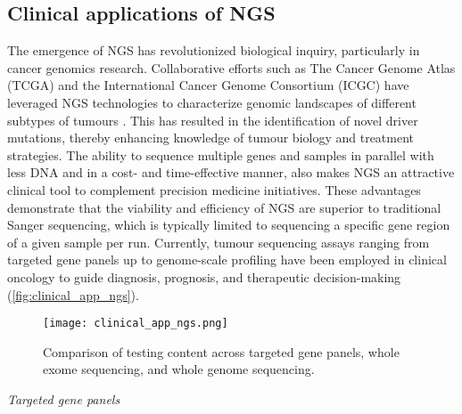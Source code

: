 
\subsection{Clinical applications of NGS}

The emergence of NGS has revolutionized biological inquiry, particularly in cancer genomics research. Collaborative efforts such as The Cancer Genome Atlas (\acs{TCGA}) and the International Cancer Genome Consortium (\acs{ICGC}) have leveraged NGS technologies to characterize genomic landscapes of different subtypes of tumours \cite{Robertson2017, Raphael2017, Ally2017, Nik-Zainal2016, Tirode2014}. This has resulted in the identification of novel driver mutations, thereby enhancing knowledge of tumour biology and treatment strategies. The ability to sequence multiple genes and samples in parallel with less DNA and in a cost- and time-effective manner, also makes NGS an attractive clinical tool to complement precision medicine initiatives. These advantages demonstrate that the viability and efficiency of NGS are superior to traditional Sanger sequencing, which is typically limited to sequencing a specific gene region of a given sample per run. Currently, tumour sequencing assays ranging from targeted gene panels up to genome-scale profiling have been employed in clinical oncology to guide diagnosis, prognosis, and therapeutic decision-making (\autoref{fig:clinical_app_ngs}).


\begin{figure}[H]
	\centering
	\texttt{[image: clinical\_app\_ngs.png]}
	\caption{Comparison of testing content across targeted gene panels, whole exome sequencing, and whole genome sequencing.}
	\label{fig:clinical_app_ngs}
\end{figure}


\vspace{5mm}
\noindent\textit{Targeted gene panels}

